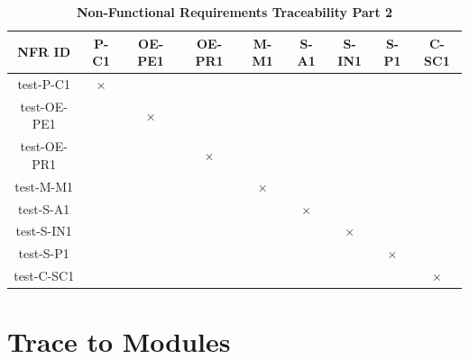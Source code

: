 \documentclass[12pt, titlepage]{article}
\begin{document}
\begin{table}[H]
\centering
\begin{tabular}{|c|c|c|c|c|c|c|c|c|}
\hline
NFR ID & P-C1 & OE-PE1 & OE-PR1 & M-M1 & S-A1 & S-IN1 & S-P1 & C-SC1 \\
\hline 
test-P-C1 & $\times$ & & & & & & &   \\
test-OE-PE1 &  & $\times$  & & & & & &   \\
test-OE-PR1 &  &  & $\times$  & & & & &   \\
test-M-M1 &  & & & $\times$  & & & &   \\
test-S-A1 &  &  & & & $\times$   & & &   \\
test-S-IN1 &  &  & & &    & $\times$ & &   \\
test-S-P1 &  &  & & &    &  & $\times$ &   \\
test-C-SC1 &  &  & & &    &  &  & $\times$  \\
\hline
\end{tabular}
\caption{\bf Non-Functional Requirements Traceability Part 2}
\end{table}

\section{Trace to Modules}		
\end{document}
